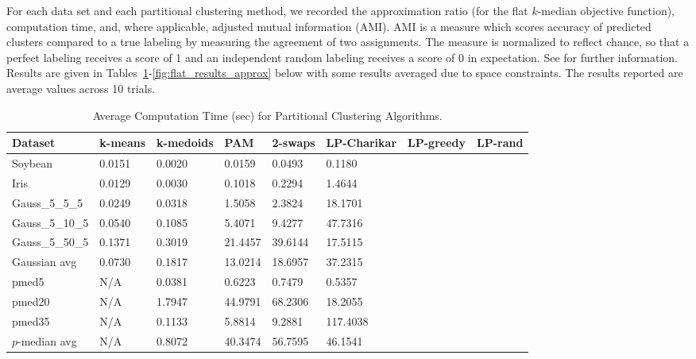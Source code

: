 \documentclass[conference, 10pt, final]{IEEEtran}
\begin{document}
For each data set and each partitional clustering method, we recorded the approximation ratio (for the flat $k$-median objective function), computation time, and, where applicable, adjusted mutual information (AMI).  AMI is a measure which scores accuracy of predicted clusters compared to a true labeling by measuring the agreement of two assignments. The measure is normalized to reflect chance, so that a perfect labeling receives a score of 1 and an independent random labeling receives a score of 0 in expectation.  See \cite{Vinh} for further information.  Results are given in Tables~\ref{fig:flat_results_comp}-\ref{fig:flat_results_approx}  below with some results averaged due to space constraints. The results reported are average values across 10 trials.

\begin{table}[!t]
\caption{Average Computation Time (sec) for Partitional Clustering Algorithms.}
\centering
\begin{tabular}{ | l | l | l | l | l | l | l | l|}
\hline
Dataset	&	k-means	&	k-medoids	&	PAM	&	2-swaps	&	LP-Charikar	&	LP-greedy	&	LP-rand	\\ \hline
Soybean	&	0.0151	&	0.0020	&	0.0159	&	0.0493	&	0.1180	&		&		\\
Iris	&	0.0129	&	0.0030	&	0.1018	&	0.2294	&	1.4644	&		&		\\
Gauss\_5\_5\_5	&	0.0249	&	0.0318	&	1.5058	&	2.3824	&	18.1701	&		&		\\
Gauss\_5\_10\_5	&	0.0540	&	0.1085	&	5.4071	&	9.4277	&	47.7316	&		&		\\
Gauss\_5\_50\_5	&	0.1371	&	0.3019	&	21.4457	&	39.6144	&	17.5115	&		&		\\
Gaussian avg	&	0.0730	&	0.1817	&	13.0214	&	18.6957	&	37.2315	&		&		\\
pmed5	&	N/A	&	0.0381	&	0.6223	&	0.7479	&	0.5357	&		&		\\
pmed20	&	N/A	&	1.7947	&	44.9791	&	68.2306	&	18.2055	&		&		\\
pmed35	&	N/A	&	0.1133	&	5.8814	&	9.2881	&	117.4038	&		&		\\
$p$-median avg	&	N/A	&	0.8072	&	40.3474	&	56.7595	&	46.1541	&		&		\\ \hline
\end{tabular}
\label{fig:flat_results_comp}
\end{table}
\end{document}
